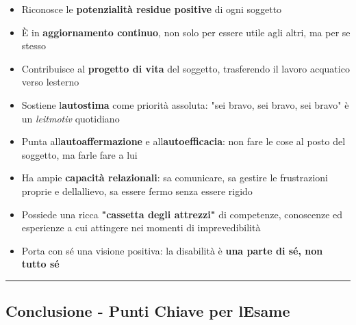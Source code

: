 \documentclass[a4paper,11pt]{article}
\providecommand{\tightlist}{%
  \setlength{\itemsep}{0pt}\setlength{\parskip}{0pt}}
\begin{document}
\begin{itemize}
      \tightlist
      \item
            Riconosce le \textbf{potenzialità residue positive} di ogni soggetto
      \item
            È in \textbf{aggiornamento continuo}, non solo per essere utile agli
            altri, ma per se stesso
      \item
            Contribuisce al \textbf{progetto di vita} del soggetto, trasferendo il
            lavoro acquatico verso l\textquotesingle esterno
      \item
            Sostiene l\textquotesingle{}\textbf{autostima} come priorità assoluta:
            "sei bravo, sei bravo, sei bravo" è un \emph{leitmotiv} quotidiano
      \item
            Punta all\textquotesingle{}\textbf{autoaffermazione} e
            all\textquotesingle{}\textbf{autoefficacia}: non fare le cose al posto
            del soggetto, ma farle fare a lui
      \item
            Ha ampie \textbf{capacità relazionali}: sa comunicare, sa gestire le
            frustrazioni proprie e dell\textquotesingle allievo, sa essere fermo
            senza essere rigido
      \item
            Possiede una ricca \textbf{"cassetta degli attrezzi"} di competenze,
            conoscenze ed esperienze a cui attingere nei momenti di
            imprevedibilità
      \item
            Porta con sé una visione positiva: la disabilità è \textbf{una parte
                  di sé, non tutto sé}
\end{itemize}

\begin{center}\rule{0.5\linewidth}{0.5pt}\end{center}

\subsection{Conclusione - Punti Chiave per
      l\textquotesingle Esame}\label{conclusione---punti-chiave-per-lesame-8}
\end{document}
